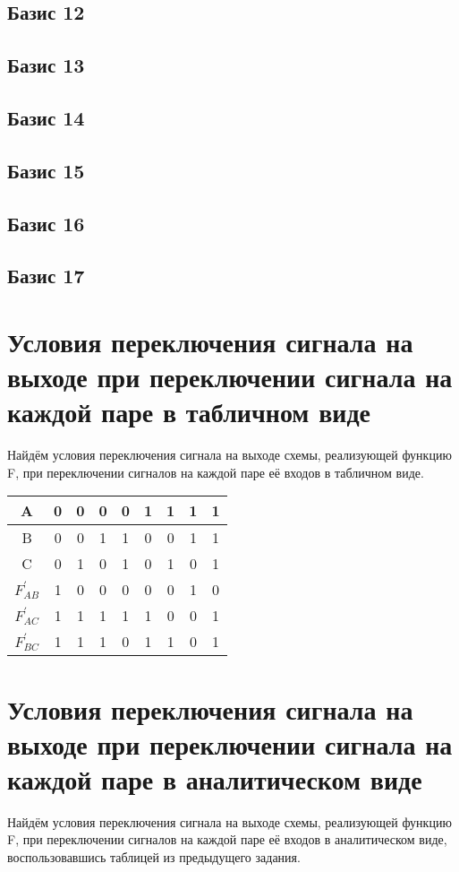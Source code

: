 \documentclass[a4paper,10pt]{article} %
\begin{document}
	\subsection{Базис 12}
	
	\subsection{Базис 13}
	
	\subsection{Базис 14}
	
	\subsection{Базис 15}
	
	\subsection{Базис 16}
	
	\subsection{Базис 17}
	
	\section{Условия переключения сигнала на выходе при переключении сигнала на каждой паре в табличном виде}
	Найдём условия переключения сигнала на выходе схемы, реализующей функцию F, при переключении сигналов на каждой паре её входов в табличном виде.
	
	\begin{tabular}{|c|c|c|c|c|c|c|c|c|}
		\hline 
		A & 0 & 0 & 0 & 0 & 1 & 1 & 1 & 1 \\ 
		\hline 
		B & 0 & 0 & 1 & 1 & 0 & 0 & 1 & 1 \\ 
		\hline 
		C & 0 & 1 & 0 & 1 & 0 & 1 & 0 & 1 \\ 
		\hline 
		$F_{AB}^{\prime}$ & 1 & 0 & 0 & 0 & 0 & 0 & 1 & 0 \\ 
		\hline 
		$F_{AC}^{\prime}$ & 1 & 1 & 1 & 1 & 1 & 0 & 0 & 1 \\ 
		\hline 
		$F_{BC}^{\prime}$ & 1 & 1 & 1 & 0 & 1 & 1 & 0 & 1 \\ 
		\hline 
	\end{tabular} 


	\section{Условия переключения сигнала на выходе при переключении сигнала на каждой паре в аналитическом виде}
	Найдём условия переключения сигнала на выходе схемы, реализующей функцию F, при переключении сигналов на каждой паре её входов в аналитическом виде, воспользовавшись таблицей из предыдущего задания.
	
\end{document}
